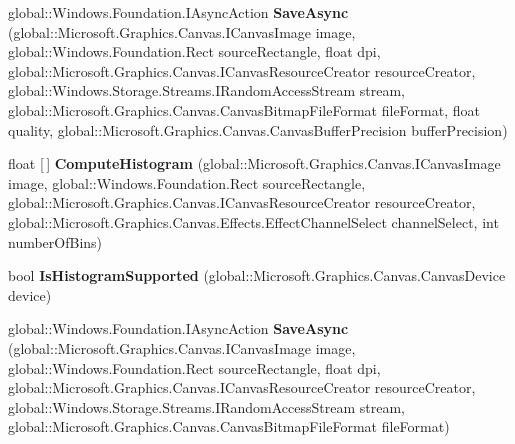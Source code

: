 \begin{DoxyCompactItemize}
global\+::\+Windows.\+Foundation.\+I\+Async\+Action {\bfseries Save\+Async} (global\+::\+Microsoft.\+Graphics.\+Canvas.\+I\+Canvas\+Image image, global\+::\+Windows.\+Foundation.\+Rect source\+Rectangle, float dpi, global\+::\+Microsoft.\+Graphics.\+Canvas.\+I\+Canvas\+Resource\+Creator resource\+Creator, global\+::\+Windows.\+Storage.\+Streams.\+I\+Random\+Access\+Stream stream, global\+::\+Microsoft.\+Graphics.\+Canvas.\+Canvas\+Bitmap\+File\+Format file\+Format, float quality, global\+::\+Microsoft.\+Graphics.\+Canvas.\+Canvas\+Buffer\+Precision buffer\+Precision)
\item 
\mbox{\label{interface_microsoft_1_1_graphics_1_1_canvas_1_1_i_canvas_image_statics_a21324f0dd43dd52006fc02fb9aa474d3}} 
float \mbox{[}$\,$\mbox{]} {\bfseries Compute\+Histogram} (global\+::\+Microsoft.\+Graphics.\+Canvas.\+I\+Canvas\+Image image, global\+::\+Windows.\+Foundation.\+Rect source\+Rectangle, global\+::\+Microsoft.\+Graphics.\+Canvas.\+I\+Canvas\+Resource\+Creator resource\+Creator, global\+::\+Microsoft.\+Graphics.\+Canvas.\+Effects.\+Effect\+Channel\+Select channel\+Select, int number\+Of\+Bins)
\item 
\mbox{\label{interface_microsoft_1_1_graphics_1_1_canvas_1_1_i_canvas_image_statics_ae36ced4f89421bf05ceea6e51eb6f95b}} 
bool {\bfseries Is\+Histogram\+Supported} (global\+::\+Microsoft.\+Graphics.\+Canvas.\+Canvas\+Device device)
\item 
\mbox{\label{interface_microsoft_1_1_graphics_1_1_canvas_1_1_i_canvas_image_statics_a24c2e03f2a0d0284e0926c456f6c05cd}} 
global\+::\+Windows.\+Foundation.\+I\+Async\+Action {\bfseries Save\+Async} (global\+::\+Microsoft.\+Graphics.\+Canvas.\+I\+Canvas\+Image image, global\+::\+Windows.\+Foundation.\+Rect source\+Rectangle, float dpi, global\+::\+Microsoft.\+Graphics.\+Canvas.\+I\+Canvas\+Resource\+Creator resource\+Creator, global\+::\+Windows.\+Storage.\+Streams.\+I\+Random\+Access\+Stream stream, global\+::\+Microsoft.\+Graphics.\+Canvas.\+Canvas\+Bitmap\+File\+Format file\+Format)
\item 
\mbox{\label{interface_microsoft_1_1_graphics_1_1_canvas_1_1_i_canvas_image_statics_a1d356baa8a7f7e5d8a5a583ba30a2008}} 

\end{DoxyCompactItemize}
